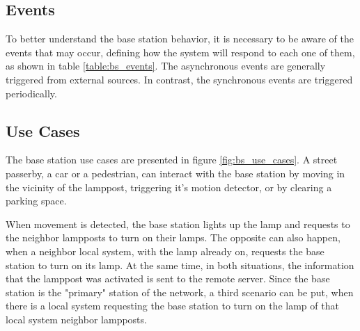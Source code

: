 \subsection{Events}
To better understand the base station behavior, it is necessary to be aware of the events that may occur, defining how the system will respond to each one of them, as shown in table \ref{table:bs_events}. The asynchronous events are generally triggered from external sources. In contrast, the synchronous events are triggered periodically.

\begin{table}[h]
	\centering
	
	\caption{Base station events.}
	\label{table:bs_events}
\end{table}

\subsection{Use Cases}
The base station use cases are presented in figure \ref{fig:bs_use_cases}. A street passerby, a car or a pedestrian, can interact with the base station by moving in the vicinity of the lamppost, triggering it's motion detector, or by clearing a parking space.

When movement is detected, the base station lights up the lamp and requests to the neighbor lampposts to turn on their lamps. The opposite can also happen, when a neighbor local system, with the lamp already on, requests the base station to turn on its lamp. At the same time, in both situations, the information that the lamppost was activated is sent to the remote server. Since the base station is the "primary" station of the network, a third scenario can be put, when there is a local system requesting the base station to turn on the lamp of that local system neighbor lampposts.

